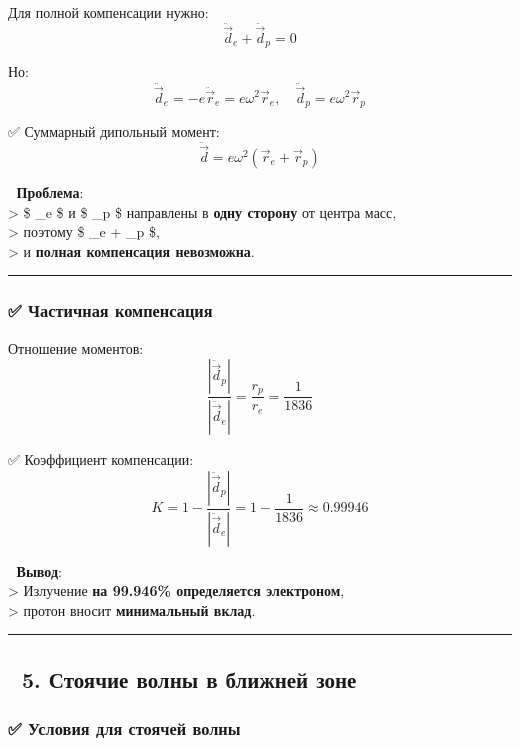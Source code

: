 \documentclass[11pt]{article}
\begin{document}
Для полной компенсации нужно: \[
\ddot{\vec{d}}_e + \ddot{\vec{d}}_p = 0
\]

Но: \[
\ddot{\vec{d}}_e = -e \ddot{\vec{r}}_e = e \omega^2 \vec{r}_e, \quad \ddot{\vec{d}}_p = e \omega^2 \vec{r}_p
\]

✅ Суммарный дипольный момент: \[
\ddot{\vec{d}} = e \omega^2 (\vec{r}_e + \vec{r}_p)
\]

📌 \textbf{Проблема}:\\
\textgreater{} \$ \_e \$ и \$ \_p \$ направлены в
\textbf{одну сторону} от центра масс,\\
\textgreater{} поэтому \$ \_e + \_p  \$,\\
\textgreater{} и \textbf{полная компенсация невозможна}.

\begin{center}\rule{0.5\linewidth}{\linethickness}\end{center}

\subsubsection{✅ Частичная
компенсация}\label{ux447ux430ux441ux442ux438ux447ux43dux430ux44f-ux43aux43eux43cux43fux435ux43dux441ux430ux446ux438ux44f}

Отношение моментов: \[
\frac{|\ddot{\vec{d}}_p|}{|\ddot{\vec{d}}_e|} = \frac{r_p}{r_e} = \frac{1}{1836}
\]

✅ Коэффициент компенсации: \[
K = 1 - \frac{|\ddot{\vec{d}}_p|}{|\ddot{\vec{d}}_e|} = 1 - \frac{1}{1836} \approx 0.99946
\]

📌 \textbf{Вывод}:\\
\textgreater{} Излучение \textbf{на 99.946\% определяется электроном},\\
\textgreater{} протон вносит \textbf{минимальный вклад}.

\begin{center}\rule{0.5\linewidth}{\linethickness}\end{center}

\subsection{🔹 5. Стоячие волны в ближней
зоне}\label{ux441ux442ux43eux44fux447ux438ux435-ux432ux43eux43bux43dux44b-ux432-ux431ux43bux438ux436ux43dux435ux439-ux437ux43eux43dux435}

\subsubsection{✅ Условия для стоячей
волны}\label{ux443ux441ux43bux43eux432ux438ux44f-ux434ux43bux44f-ux441ux442ux43eux44fux447ux435ux439-ux432ux43eux43bux43dux44b}
\end{document}
